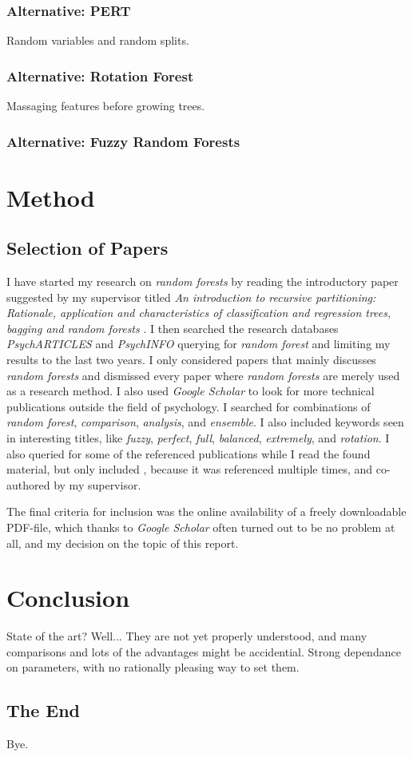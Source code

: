 \documentclass[a4paper,man,12pt,apacite]{apa6} %
\begin{document}
\subsubsection{Alternative: PERT}
Random variables and random splits.

\subsubsection{Alternative: Rotation Forest}
Massaging features before growing trees.

\subsubsection{Alternative: Fuzzy Random Forests}

\section{Method}

\subsection{Selection of Papers}
I have started my research on \emph{random forests} by reading the
introductory paper suggested by my supervisor titled
\emph{An introduction to recursive partitioning: Rationale, application
and characteristics of classification and regression trees, bagging and
random forests} \cite{strobl2009introduction}.
I then searched the research databases \emph{PsychARTICLES} and
\emph{PsychINFO} querying for \emph{random forest} and limiting my results
to the last two years.
I only considered papers that mainly discusses \emph{random forests} and
dismissed every paper where \emph{random forests} are merely used as a
research method.
I also used \emph{Google Scholar} to look for more technical
publications outside the field of psychology.
I searched for combinations of \emph{random forest}, \emph{comparison},
\emph{analysis}, and \emph{ensemble}.
I also included keywords seen in interesting titles, like \emph{fuzzy},
\emph{perfect}, \emph{full}, \emph{balanced}, \emph{extremely}, and
\emph{rotation}.
I also queried for some of the referenced publications while I read the
found material, but only included \cite{strobl2008conditional}, because
it was referenced multiple times, and co-authored by my supervisor.

The final criteria for inclusion was the online availability of a freely
downloadable PDF-file, which thanks to \emph{Google Scholar} often turned
out to be no problem at all, and my decision on the topic of
this report.

\section{Conclusion}
State of the art? Well... They are not yet properly understood, and
many comparisons and lots of the advantages might be accidential.
Strong dependance on parameters, with no rationally pleasing way to set them.

\subsection{The End}
Bye.


\end{document}

